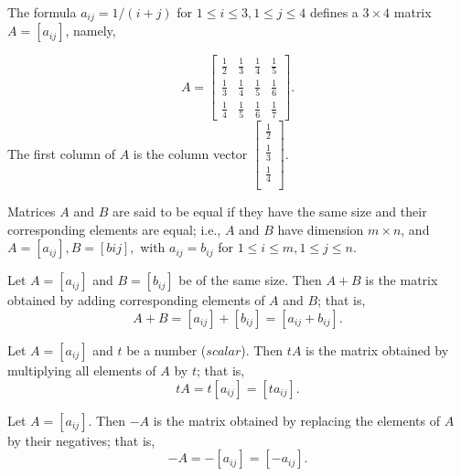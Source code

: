 \documentclass[../main.tex]{subfiles}
\begin{document}
\begin{example}
	The formula $a_{ij} = 1/(i + j)$ for $1 \leq i \leq 3, 1 \leq j \leq 4$ defines a $3 \times 4$ matrix $A = [a_{ij}]$, namely,

	$$ A =
	\begin{bmatrix}
	\frac{1}{2} & \frac{1}{3} & \frac{1}{4} & \frac{1}{5} \\
	\frac{1}{3} & \frac{1}{4} & \frac{1}{5} & \frac{1}{6} \\
	\frac{1}{4} & \frac{1}{5} & \frac{1}{6} & \frac{1}{7}
	\end{bmatrix}
	. $$
	The first column of $A$ is the column vector
	$
	\begin{bmatrix}
		\frac{1}{2} \\ \frac{1}{3} \\ \frac{1}{4}\\
	\end{bmatrix}.
	$
\end{example}

\begin{definition}
	\label{defn:defn_1_1}
	Matrices $A$ and $B$ are said to be equal if they have the same size and their corresponding elements are equal; i.e., $A$ and $B$ have dimension $m \times n$, and $A = [a_{ij}], B = [b{ij}],$ with $a_{ij} = b_{ij}$ for $1 \leq i \leq m, 1 \leq j \leq n.$
\end{definition}

\begin{definition}
	\label{defn:defn_1_2}
	Let $A = [a_{ij}]$ and $B = [b_{ij}]$ be of the same size. Then $A+B$ is the matrix obtained by adding corresponding elements of $A$ and $B$; that is,
	$$A + B = [a_{ij}] + [b_{ij}] = [a_{ij} + b_{ij}].$$
\end{definition}

\begin{definition}
	\label{defn:defn_1_3}
	Let $A = [a_{ij}]$ and $t$ be a number ($scalar$). Then $tA$ is the matrix obtained by multiplying all elements of $A$ by $t$; that is,
	$$tA = t[a_{ij}] = [ta_{ij}].$$
\end{definition}

\begin{definition}
	\label{defn:defn_1_4}
	Let $A = [a_{ij}].$ Then $-A$ is the matrix obtained by replacing the elements of $A$ by their negatives; that is,
	$$-A = -[a_{ij}] = [-a_{ij}].$$
\end{definition}
\end{document}
